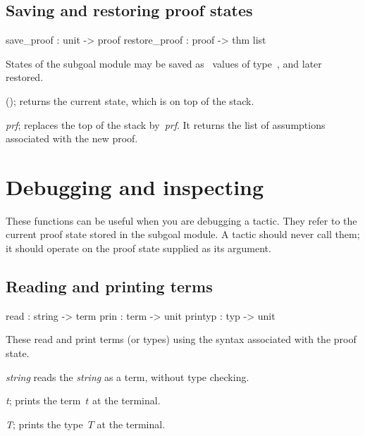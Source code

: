 \subsection{Saving and restoring proof states}
\begin{ttbox} 
save_proof    : unit -> proof
restore_proof : proof -> thm list
\end{ttbox}
States of the subgoal module may be saved as \ML\ values of
type~, and later restored.

\begin{ttdescription}
\item[\ttindexbold{save_proof}();]  
returns the current state, which is on top of the stack.

\item[\ttindexbold{restore_proof} {\it prf};]
  replaces the top of the stack by~{\it prf}.  It returns the list of
  assumptions associated with the new proof.
\end{ttdescription}


\section{Debugging and inspecting}
These functions can be useful when you are debugging a tactic.  They refer
to the current proof state stored in the subgoal module.  A tactic
should never call them; it should operate on the proof state supplied as its
argument.

\subsection{Reading and printing terms}
\begin{ttbox} 
read    : string -> term
prin    : term -> unit
printyp : typ -> unit
\end{ttbox}
These read and print terms (or types) using the syntax associated with the
proof state.

\begin{ttdescription}
\item[\ttindexbold{read} {\it string}]  
reads the {\it string} as a term, without type checking.

\item[\ttindexbold{prin} {\it t};]  
prints the term~$t$ at the terminal.

\item[\ttindexbold{printyp} {\it T};]  
prints the type~$T$ at the terminal.
\end{ttdescription}

